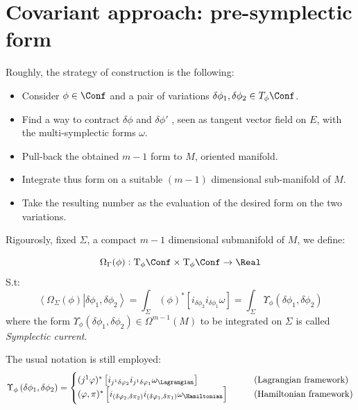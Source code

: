 \documentclass[a4paper,12pt,fleqn]{scrartcl}  %
\begin{document}
\newpage
\section{Covariant approach: pre-symplectic form}
 Roughly, the strategy of construction is the following:

	\begin{center}
		
	\end{center}
%
	\begin{itemize}
		\item Consider $\phi \in \Conf$ and 
		a pair of variations $\delta \phi_1 , \delta \phi_2 \in T_\phi \Conf$.
		\item Find a way to contract $\delta \phi$ and $\delta \phi '$ , seen as tangent vector field on $E$, with the multi-symplectic forms $\omega$.
		\item Pull-back the obtained $m-1$ form to $M$, oriented manifold.
		\item Integrate thus form on a suitable $(m-1)$ dimensional sub-manifold of $M$.
		\item Take the resulting number as the evaluation of the desired form on the two variations.  
	\end{itemize}
  
	\vspace{0.5cm}
Rigourosly, fixed  $\Sigma$, a compact $m-1$ dimensional submanifold of $M$, we define:
\begin{definition}\label{Def:presymform}
	\begin{displaymath}
		\Omega_\Gamma ( \phi ) : \textrm{T}_\phi \Conf \times \textrm{T}_\phi \Conf \rightarrow \Real
\end{displaymath}		
	S.t:
	\begin{displaymath}
		\left\langle	\Omega_\Sigma ( \phi) \right.\left\lvert \delta \phi_1 , \delta \phi_2 \right\rangle =		
		\int_\Sigma (\phi)^\ast \left[ i_{\delta\phi_2} i_{\delta \phi_1} \omega \right] =
		\int_\Sigma \Upsilon_\phi \left( \delta \phi_1 , \delta \phi_2 \right)
	\end{displaymath}
where the form $\Upsilon_\phi \left( \delta \phi_1 , \delta \phi_2 \right)  \in \Omega^{m-1}(M)$ to be integrated on $\Sigma$ is called \emph{Symplectic current}.
\end{definition}
\begin{notation}
	The usual notation is still employed:
	\begin{displaymath}
		\Upsilon_\phi \left( \delta \phi_1 , \delta \phi_2 \right) = 
			\begin{cases}
				(j^1 \varphi)^\ast \left[ i_{j^1 \delta\varphi_2} i_{j^1 \delta \varphi_1} \omega_\Lagrangian \right]
				& \qquad \textrm{(Lagrangian framework)} \\
				(\varphi, \pi)^\ast \left[ i_{( \delta \varphi_2, \delta \pi_2)} i_{( \delta \varphi_1, \delta \pi_1)} \omega_\Hamiltonian \right]
				& \qquad \textrm{(Hamiltonian framework)} 		
			\end{cases}	
	\end{displaymath}

\end{notation}
\end{document}
